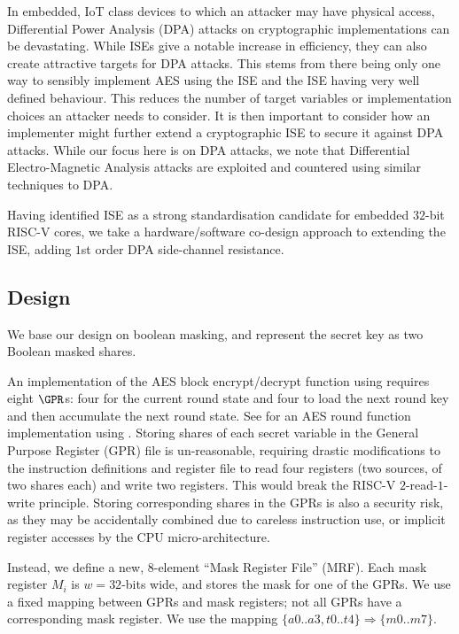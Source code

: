 
In embedded, IoT class devices to which an attacker may have
physical access,
Differential Power Analysis (DPA) attacks on cryptographic implementations
\cite{KJJ:99} can be devastating.
While ISEs give a notable increase in efficiency, they can also create
attractive targets for DPA attacks.
This stems from there being only one way to sensibly implement
AES using the ISE and the ISE having very well defined behaviour.
This reduces the number of target variables or
implementation choices an attacker needs to consider.
It is then important to consider how an implementer might
further extend a cryptographic ISE to secure it against DPA attacks.
While our focus here is on DPA attacks, we note that Differential
Electro-Magnetic Analysis attacks are exploited and countered using
similar techniques to DPA.

Having identified ISE  as a strong standardisation candidate
for embedded $32$-bit RISC-V cores, we take a hardware/software co-design
approach to extending the ISE, adding $1$st order DPA side-channel
resistance.

\subsection{Design}

We base our design on boolean masking, and represent the secret
key as two Boolean masked shares.

An implementation of the AES block encrypt/decrypt function 
using  requires eight $\GPR$s:
four for the current round state and
four to load the next round key
and
then accumulate the next round state.
See  for an AES round function implementation
using .
Storing shares of each secret variable
in the General Purpose Register (GPR) file is un-reasonable,
requiring drastic modifications to the instruction definitions and
register file to read four registers (two sources, of two shares each) and
write two registers.
This would break the RISC-V $2$-read-$1$-write principle.
Storing corresponding shares in the GPRs is also a security
risk, as they may be accidentally combined due to
careless instruction use, or implicit register accesses by the
CPU micro-architecture.

Instead, we define a new, $8$-element ``Mask Register File'' (MRF).
Each mask register $M_i$ is $w=32$-bits wide, and stores the mask for
one of the GPRs.
We use a fixed mapping between GPRs and mask registers;
not all GPRs have a corresponding mask register.
We use the mapping $\{a0..a3,t0..t4\} \Rightarrow \{m0..m7\}$.

